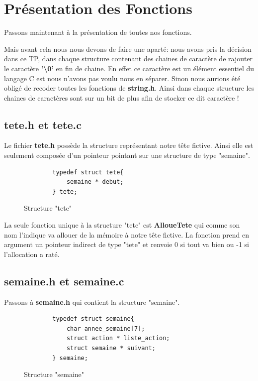 \documentclass[12pt,french]{article} %
\begin{document}
\section{Présentation des Fonctions}
Passons maintenant à la présentation de toutes nos fonctions.\newline

Mais avant cela nous nous devons de faire une aparté: nous avons pris la décision dans ce TP, dans chaque structure contenant des chaines de caractère de rajouter le caractère \textbf{'\textbackslash0'} en fin de chaine. En effet ce caractère est un élément essentiel du langage C est nous n'avons pas voulu nous en séparer. Sinon nous aurions été obligé de recoder toutes les fonctions de \textbf{string.h}. Ainsi dans chaque structure les chaines de caractères sont sur un bit de plus afin de stocker ce dit caractère !

\subsection{tete.h et tete.c}

Le fichier \textbf{tete.h} possède la structure représentant notre tête fictive. Ainsi elle est seulement composée d'un pointeur pointant sur une structure de type "semaine".\newline

\begin{figure}[H]
	\begin{lstlisting}
		typedef struct tete{
			semaine * debut;
		} tete;
	\end{lstlisting}
	\caption{Structure "tete"}
\end{figure}

La seule fonction unique à la structure "tete" est \textbf{AlloueTete} qui comme son nom l'indique va allouer de la mémoire à notre tête fictive. La fonction prend en argument un pointeur indirect de type "tete" et renvoie 0 si tout va bien ou -1 si l'allocation a raté.

\subsection{semaine.h et semaine.c}

Passons à \textbf{semaine.h} qui contient la structure "semaine".


\begin{figure}[H]
	\begin{lstlisting}
		typedef struct semaine{
			char annee_semaine[7];
			struct action * liste_action;
			struct semaine * suivant;
		} semaine;
	\end{lstlisting}
	\caption{Structure "semaine"}
\end{figure}
\end{document}
